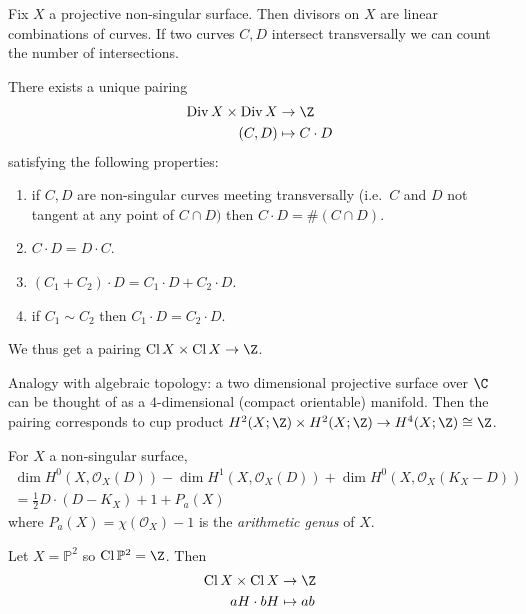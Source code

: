 \documentclass[a4paper]{article}
\renewcommand*{\P}{\mathbb{P}}
\newcommand{\sh}[1]{\mathcal{#1}} %
\DeclareMathOperator{\Div}{Div} %
\DeclareMathOperator{\Cl}{Cl} %
\begin{document}
Fix \(X\) a projective non-singular surface. Then divisors on \(X\) are linear combinations of curves. If two curves \(C, D\) intersect transversally we can count the number of intersections.

\begin{theorem}
  There exists a unique pairing
  \begin{align*}
    \Div X \times \Div X &\to \Z \\
    (C, D) &\mapsto C \cdot D
  \end{align*}
  satisfying the following properties:
  \begin{enumerate}
  \item if \(C, D\) are non-singular curves meeting transversally (i.e.\ \(C\) and \(D\) not tangent at any point of \(C \cap D)\) then \(C \cdot D = \#(C \cap D)\).
  \item \(C \cdot D = D \cdot C\).
  \item \((C_1 + C_2) \cdot D = C_1 \cdot D + C_2 \cdot D\). 
  \item if \(C_1 \sim C_2\) then \(C_1 \cdot D = C_2 \cdot D\).
  \end{enumerate}
  We thus get a pairing \(\Cl X \times \Cl X \to \Z\).
\end{theorem}

Analogy with algebraic topology: a two dimensional projective surface over \(\C\) can be thought of as a \(4\)-dimensional (compact orientable) manifold. Then the pairing corresponds to cup product \(H^2(X; \Z) \times H^2(X; \Z) \to H^4(X; \Z) \cong \Z\).

\begin{theorem}
  For \(X\) a non-singular surface,
  \begin{align*}
    \dim H^0(X, \sh O_X(D)) - \dim H^1(X, \sh O_X(D)) + \dim H^0(X, \sh O_X(K_X - D)) \\
    = \frac{1}{2} D \cdot (D - K_X) + 1 + P_a(X)
  \end{align*}
  where \(P_a(X) = \chi(\sh O_X) - 1\) is the \emph{arithmetic genus} of \(X\).
\end{theorem}

\begin{eg}
  Let \(X = \P^2\) so \(\Cl \P^2 = \Z\). Then
  \begin{align*}
    \Cl X \times \Cl X &\to \Z \\
    aH \cdot bH &\mapsto ab
  \end{align*}
\end{eg}
\end{document}
